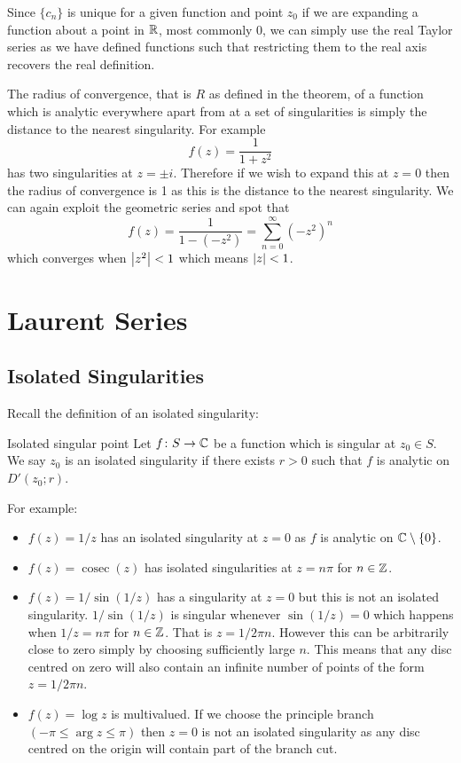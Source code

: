 \documentclass{article}
\DeclareMathOperator{\cosec}{cosec}
\newcommand{\discPunctured}[2]{D'\left({#1}; {#2}\right)}
\begin{document}
    Since \(\{c_n\}\) is unique for a given function and point \(z_0\) if we are expanding a function about a point in \(\mathbb{R}\), most commonly 0, we can simply use the real Taylor series as we have defined functions such that restricting them to the real axis recovers the real definition.
    
    The radius of convergence, that is \(R\) as defined in the theorem, of a function which is analytic everywhere apart from at a set of singularities is simply the distance to the nearest singularity.
    For example
    \[f(z) = \frac{1}{1 + z^2}\]
    has two singularities at \(z = \pm i\).
    Therefore if we wish to expand this at \(z = 0\) then the radius of convergence is 1 as this is the distance to the nearest singularity.
    We can again exploit the geometric series and spot that
    \[f(z) = \frac{1}{1 - (-z^2)} = \sum_{n=0}^{\infty}(-z^2)^n\]
    which converges when \(\abs{z^2}< 1\) which means \(\abs{z} < 1\).
    
    \section{Laurent Series}
    \subsection{Isolated Singularities}
    Recall the definition of an isolated singularity:
    \begin{definition*}{Isolated singular point}{}
        Let \(f\colon S\to \mathbb{C}\) be a function which is singular at \(z_0\in S\).
        We say \(z_0\) is an isolated singularity if there exists \(r > 0\) such that \(f\) is analytic on \(\discPunctured{z_0}{r}\).
    \end{definition*}
    For example:
    \begin{itemize}
        \item \(f(z) = 1/z\) has an isolated singularity at \(z = 0\) as \(f\) is analytic on \(\mathbb{C}\setminus\{0\}\).
        \item \(f(z) = \cosec(z)\) has isolated singularities at \(z = n\pi\) for \(n\in \mathbb{Z}\).
        \item \(f(z) = 1/\sin(1/z)\) has a singularity at \(z = 0\) but this is not an isolated singularity.
        \(1/\sin(1/z)\) is singular whenever \(\sin(1/z) = 0\) which happens when \(1/z = n\pi\) for \(n\in \mathbb{Z}\).
        That is \(z = 1/2\pi n\).
        However this can be arbitrarily close to zero simply by choosing sufficiently large \(n\).
        This means that any disc centred on zero will also contain an infinite number of points of the form \(z = 1/2\pi n\).
        \item \(f(z) = \log z\) is multivalued.
        If we choose the principle branch \((-\pi\le \arg z \le\pi)\) then \(z = 0\) is not an isolated singularity as any disc centred on the origin will contain part of the branch cut.
    \end{itemize}
    
\end{document}
